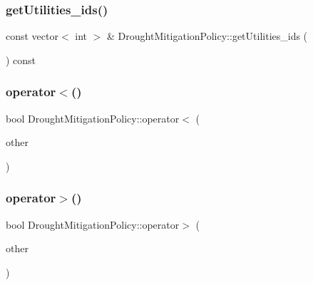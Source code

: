\subsubsection{\texorpdfstring{get\+Utilities\+\_\+ids()}{getUtilities\_ids()}}
{\footnotesize\ttfamily const vector$<$ int $>$ \& Drought\+Mitigation\+Policy\+::get\+Utilities\+\_\+ids (\begin{DoxyParamCaption}{ }\end{DoxyParamCaption}) const}

\mbox{\label{classDroughtMitigationPolicy_a0bf7d0fa94377ae6814e529daf0204c4}} 
\subsubsection{\texorpdfstring{operator$<$()}{operator<()}}
{\footnotesize\ttfamily bool Drought\+Mitigation\+Policy\+::operator$<$ (\begin{DoxyParamCaption}\item[{const \mbox{\hyperlink{classDroughtMitigationPolicy}{Drought\+Mitigation\+Policy}} $\ast$}]{other }\end{DoxyParamCaption})}

\mbox{\label{classDroughtMitigationPolicy_a576d3ddb09dc9372898a63c0949d08a6}} 
\subsubsection{\texorpdfstring{operator$>$()}{operator>()}}
{\footnotesize\ttfamily bool Drought\+Mitigation\+Policy\+::operator$>$ (\begin{DoxyParamCaption}\item[{const \mbox{\hyperlink{classDroughtMitigationPolicy}{Drought\+Mitigation\+Policy}} $\ast$}]{other }\end{DoxyParamCaption})}

\mbox{\label{classDroughtMitigationPolicy_a5d2033543cacca1e412eebef5106eab4}} 
